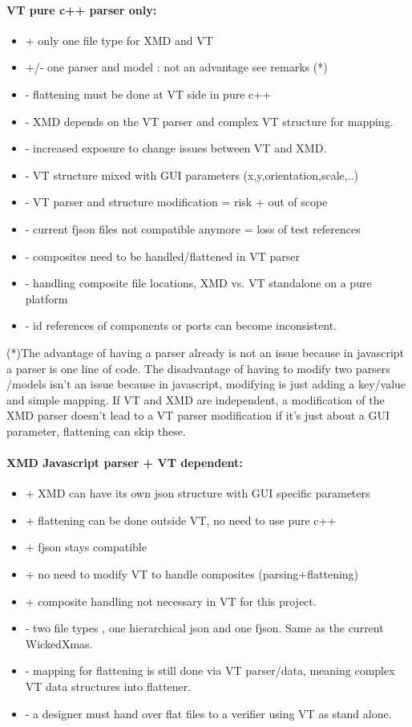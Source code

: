 \documentclass[a4paper,11pt,final]{article}
\begin{document}
\paragraph{VT pure c++ parser only:}
\begin{itemize}
\item + only one file type for XMD and VT
\item +/- one parser and model : not an advantage see remarks (*)
\item - flattening must be done at VT side in pure c++
\item - XMD depends on the VT parser and complex VT structure for mapping.
\item - increased exposure to change issues between VT and XMD.
\item - VT structure mixed with GUI parameters (x,y,orientation,scale,..)
\item - VT parser and structure modification = risk + out of scope
\item - current fjson files not compatible anymore = loss of test references
\item - composites need to be handled/flattened in VT parser
\item - handling composite file locations, XMD vs. VT standalone on a pure platform
\item - id references of components or ports can become inconsistent.
\end{itemize}

(*)The advantage of having a parser already is not an issue because in
javascript a parser is one line of code.
The disadvantage of having to modify two parsers /models isn’t an issue
because in javascript, modifying is just adding a key/value and simple mapping.
If VT and XMD are independent, a modification of the XMD parser doesn’t lead to
a VT parser modification if it’s just about a GUI parameter, flattening can skip these.

\paragraph{XMD Javascript parser + VT dependent:}
\begin{itemize}
\item + XMD can have its own json structure with GUI specific parameters
\item + flattening can be done outside VT, no need to use pure c++
\item + fjson stays compatible
\item + no need to modify VT to handle composites (parsing+flattening)
\item + composite handling not necessary in VT for this project.
\item - two file types , one hierarchical json and one fjson. Same as the current WickedXmas.
\item - mapping for flattening is still done via VT parser/data, meaning complex VT data structures into flattener.
\item - a designer must hand over flat files to a verifier using VT as stand alone. 
\end{itemize}
\end{document}
